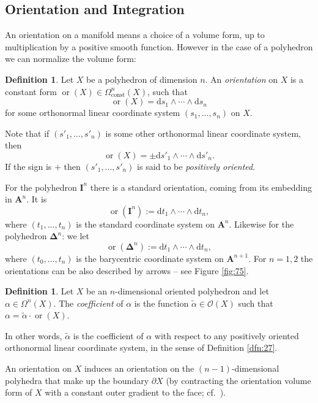 \documentclass[10pt, a4paper]{amsart}
\theoremstyle{definition}
\newtheorem{dfn}[equation]{Definition}
\numberwithin{equation}{section}
\newcommand{\opn}{\operatorname}
\newcommand{\mcal}[1]{\mathcal{#1}}
\newcommand{\mbf}[1]{\mathbf{#1}}
\newcommand{\mrm}[1]{\mathrm{#1}}
\newcommand{\bsym}[1]{\boldsymbol{#1}}
\newcommand{\til}[1]{\tilde{#1}}
\renewcommand{\d}{\mrm{d}}
\begin{document}
\subsection{Orientation and Integration} \label{subsec:orient}
An orientation on a manifold means a choice of a volume form, up to
multiplication by a positive smooth function. However in the case of a
polyhedron we can normalize the volume form:

\begin{dfn}
Let $X$ be a polyhedron of dimension $n$.
An {\em orientation} on $X$ is a constant form 
$\opn{or}(X) \in \Omega_{\mrm{const}}^n(X)$, 
such that 
\[ \opn{or}(X) =  \d s_1 \wedge \cdots \wedge \d s_n \]
for some orthonormal linear coordinate system 
$(s_1, \ldots, s_n)$ on $X$. 
\end{dfn}

Note that if $(s'_1, \ldots, s'_n)$ is some other orthonormal linear coordinate
system, then 
\[ \opn{or}(X) = \pm \d s'_1 \wedge \cdots \wedge \d s'_n . \]
If the sign is $+$ then $(s'_1, \ldots, s'_n)$ is said to be {\em  positively
oriented}.

For the polyhedron $\mbf{I}^n$ there is a standard orientation, coming from
its embedding in $\mbf{A}^{n}$. It is 
\[ \opn{or}(\mbf{I}^n) := \d t_1 \wedge \cdots \wedge \d t_n , \]
where $(t_1, \ldots, t_n)$ is the standard coordinate system on $\mbf{A}^{n}$.
Likewise for the polyhedron $\bsym{\Delta}^n$:
we let
\[ \opn{or}(\bsym{\Delta}^n) := \d t_1 \wedge \cdots \wedge \d t_n , \]
where $(t_0, \ldots, t_n)$ is the barycentric coordinate system on 
$\mbf{A}^{n+1}$. 
For $n = 1, 2$ the orientations can be also described by arrows -- see Figure
\ref{fig:75}.

\begin{dfn} \label{dfn:24}
Let $X$ be an $n$-dimensional oriented polyhedron and let
$\alpha \in \Omega^n(X)$. 
The {\em coefficient} of $\alpha$ is the function 
$\til{\alpha} \in \mcal{O}(X)$ such that
$\alpha = \til{\alpha} \cdot \opn{or}(X)$.
\end{dfn}

In other words, $\til{\alpha}$ is the coefficient of $\alpha$ with respect to
any positively oriented orthonormal linear coordinate system, in the sense of 
Definition \ref{dfn:27}.

An orientation on $X$ induces an orientation on the $(n-1)$-dimensional 
polyhedra that make up the boundary $\partial X$ (by contracting the
orientation volume form of $X$ with 
a constant outer gradient to the face; cf.\  \cite[Section 4.8]{Wa}).
\end{document}
